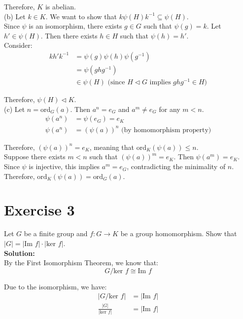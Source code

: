 \documentclass{article}
\begin{document}
Therefore, $K$ is abelian. \\

(b) Let $k \in K$. We want to show that $k\psi(H)k^{-1} \subseteq \psi(H)$. \\

Since $\psi$ is an isomorphism, there exists $g \in G$ such that $\psi(g) = k$.
Let $h' \in \psi(H)$. Then there exists $h \in H$ such that $\psi(h) = h'$. \\

Consider:
\begin{align*}
kh'k^{-1} &= \psi(g)\psi(h)\psi(g^{-1}) \\
&= \psi(ghg^{-1}) \\
&\in \psi(H) \text{ (since $H \triangleleft G$ implies $ghg^{-1} \in H$)}
\end{align*}

Therefore, $\psi(H) \triangleleft K$. \\

(c) Let $n = \text{ord}_G(a)$. Then $a^n = e_G$ and $a^m \neq e_G$ for any $m < n$.
\begin{align*}
\psi(a^n) &= \psi(e_G) = e_K \\
\psi(a^n) &= (\psi(a))^n \text{ (by homomorphism property)}
\end{align*}

Therefore, $(\psi(a))^n = e_K$, meaning that $\text{ord}_K(\psi(a)) \leq n$. \\

Suppose there exists $m < n$ such that $(\psi(a))^m = e_K$.
Then $\psi(a^m) = e_K$. Since $\psi$ is injective, this implies $a^m = e_G$, contradicting the minimality of $n$. \\

Therefore, $\text{ord}_K(\psi(a)) = \text{ord}_G(a)$.

\newpage

\section*{Exercise 3}
Let $G$ be a finite group and $f: G \to K$ be a group homomorphism. Show that $|G| = |\text{Im } f| \cdot |\text{ker } f|$. \\

\textbf{Solution:} \\

By the First Isomorphism Theorem, we know that:
   $$G/\text{ker } f \cong \text{Im } f$$

Due to the isomorphism, we have:
\begin{align*}
   |G/\text{ker } f| &= |\text{Im } f| \\
   \frac{|G|}{|\text{ker } f|} &= |\text{Im } f|
\end{align*}
\end{document}
